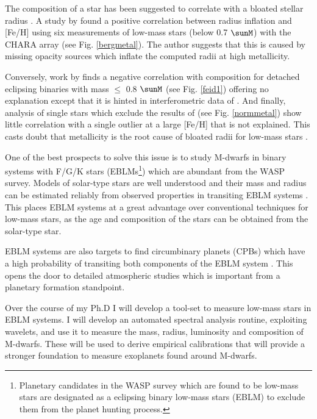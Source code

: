 The composition of a star has been suggested to correlate with a bloated stellar radius \cite{Feiden2013,Feiden2016,Demory2009}. A study by \cite{Berger2006} found a positive correlation between radius inflation and [Fe/H] using six measurements of low-mass stars (below 0.7 $\sunM$) with the CHARA array (see Fig. \ref{bergmetal}). The author suggests that this is caused by missing opacity sources which inflate the computed radii at high metallicity. 

Conversely, work by \cite{Feiden2013} finds a negative correlation with composition for detached eclipsing binaries with  mass $\leq$ 0.8 $\sunM$ (see Fig. \ref{feid1}) offering no explanation except that it is hinted in interferometric data of \cite{Boyajian2012}. And finally, analysis of single stars which exclude the results of \cite{Berger2006} (see Fig. \ref{normmetal}) show little correlation with a single outlier at a large [Fe/H] that is not explained. This casts doubt that metallicity is the root cause of bloated radii for low-mass stars \cite{Demory2009}.















One of the best prospects to solve this issue is to study M-dwarfs in binary systems with F/G/K stars (EBLMs\footnote{Planetary candidates in the WASP survey which are found to be low-mass stars are designated as a eclipsing binary low-mass stars (EBLM) to exclude them from the planet hunting process.}) which are abundant from the WASP survey. Models of solar-type stars are well understood and their mass and radius can be estimated reliably from observed properties in transiting EBLM systems \cite{Maxted2015a}. This places EBLM systems at a great advantage over conventional techniques for low-mass stars, as the age and composition of the stars can be obtained from the solar-type star. 

EBLM systems are also targets to find circumbinary planets (CPBs) which have a high probability of transiting both components of the EBLM system  \cite{Martin2015}. This opens the door to detailed  atmospheric studies which is important from a planetary  formation standpoint. 

Over the course of my Ph.D I will develop a tool-set to measure low-mass stars in EBLM systems. I will develop an automated spectral analysis routine, exploiting  wavelets, and use it to measure the mass, radius, luminosity and composition of M-dwarfs. These will be used to derive empirical calibrations that will provide a stronger foundation to measure exoplanets found around M-dwarfs. 






\fi